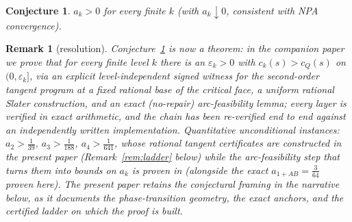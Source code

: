 \documentclass[11pt]{article}
\newtheorem{conjecture}[theorem]{Conjecture}
\newtheorem{remark}[theorem]{Remark}
\begin{document}
\begin{conjecture}\label{conj}
$a_k>0$ for every finite $k$ (with $a_k\downarrow0$, consistent with NPA
convergence).
\end{conjecture}

\begin{remark}[resolution]\label{rem:resolved}
Conjecture~\ref{conj} is now a \emph{theorem}: in the companion paper
\cite{proof} we prove that for every finite level $k$ there is an
$\varepsilon_k>0$ with $c_k(s)>c_Q(s)$ on $(0,\varepsilon_k]$, via an explicit
level-independent \emph{signed} witness for the second-order tangent program at
a fixed rational base of the critical face, a uniform rational Slater
construction, and an exact (no-repair) arc-feasibility lemma; every layer is
verified in exact arithmetic, and the chain has been re-verified
end to end against an independently written implementation. Quantitative unconditional instances:
$a_2>\tfrac1{39}$, $a_3>\tfrac1{188}$, $a_4>\tfrac1{641}$, whose rational
tangent certificates are constructed in the present paper
(Remark~\ref{rem:ladder} below) while the arc-feasibility step that turns
them into bounds on $a_k$ is proven in \cite{proof} (alongside the exact
$a_{1+AB}=\tfrac3{64}$ proven here). The present paper retains the conjectural
framing in the narrative below, as it documents the phase-transition geometry,
the exact anchors, and the certified ladder on which the proof is built.
\end{remark}
\end{document}
